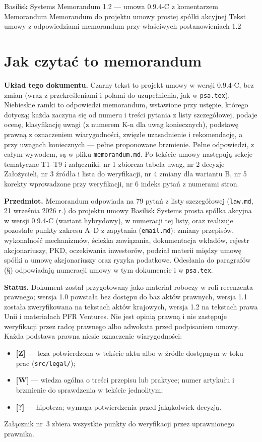 \documentclass[12pt,a4paper]{report}
\newcounter{paragraf}
\newcommand{\CompanyFull}{Basilisk Systems prosta spółka akcyjna}
\newcommand{\Wiar}[1]{\textbf{[#1]}}
\begin{document}
\BusinessPlanTitlePage
  {Basilisk Systems}
  {Memorandum 1.2 --- umowa 0.9.4-C z komentarzem}
  {Memorandum}
  {Memorandum do projektu umowy prostej spółki akcyjnej}
  {Tekst umowy z odpowiedziami memorandum przy właściwych postanowieniach}
  {1.2}

\tableofcontents
\newpage
\chapter*{Jak czytać to memorandum}

\textbf{Układ tego dokumentu.} Czarny tekst to projekt umowy w wersji 0.9.4-C, bez zmian (wraz z przekreśleniami i polami do uzupełnienia, jak w \texttt{psa.tex}). \textcolor{memoblue}{Niebieskie ramki to odpowiedzi memorandum}, wstawione przy ustępie, którego dotyczą; każda zaczyna się od numeru i treści pytania z listy szczegółowej, podaje ocenę, klasyfikację uwagi (z numerem K-n dla uwag koniecznych), podstawę prawną z oznaczeniem wiarygodności, zwięzłe uzasadnienie i rekomendację, a przy uwagach koniecznych --- pełne proponowane brzmienie. Pełne odpowiedzi, z całym wywodem, są w pliku \texttt{memorandum.md}. Po tekście umowy następują sekcje tematyczne T1--T9 i załączniki: nr 1 zbiorcza tabela uwag, nr 2 decyzje Założycieli, nr 3 źródła i lista do weryfikacji, nr 4 zmiany dla wariantu B, nr 5 korekty wprowadzone przy weryfikacji, nr 6 indeks pytań z numerami stron.

\textbf{Przedmiot.} Memorandum odpowiada na 79 pytań z listy szczegółowej (\texttt{law.md}, 21 września 2026 r.) do projektu umowy \CompanyFull{} w wersji 0.9.4-C (wariant hybrydowy), w numeracji tej listy, oraz realizuje pozostałe punkty zakresu A--D z zapytania (\texttt{email.md}): zmiany przepisów, wykonalność mechanizmów, ścieżka zawiązania, dokumentacja wkładów, rejestr akcjonariuszy, PKD, oczekiwania inwestorów, podział materii między umowę spółki a umowę akcjonariuszy oraz ryzyka podatkowe. Odesłania do paragrafów (§) odpowiadają numeracji umowy w tym dokumencie i w \texttt{psa.tex}.

\textbf{Status.} Dokument został przygotowany jako materiał roboczy w roli recenzenta prawnego; wersja 1.0 powstała bez dostępu do baz aktów prawnych, wersja 1.1 została zweryfikowana na tekstach aktów krajowych, wersja 1.2 na tekstach prawa Unii i materiałach PFR Ventures. Nie jest opinią prawną i nie zastępuje weryfikacji przez radcę prawnego albo adwokata przed podpisaniem umowy. Każda podstawa prawna niesie oznaczenie wiarygodności:
\begin{itemize}
  \item \Wiar{Z} --- teza potwierdzona w tekście aktu albo w źródle dostępnym w toku prac (\texttt{src/legal/});
  \item \Wiar{W} --- wiedza ogólna o treści przepisu lub praktyce; numer artykułu i brzmienie do sprawdzenia w tekście jednolitym;
  \item \Wiar{?} --- hipoteza; wymaga potwierdzenia przed jakąkolwiek decyzją.
\end{itemize}
Załącznik nr~3 zbiera wszystkie punkty do weryfikacji przez uprawnionego prawnika.
\end{document}
